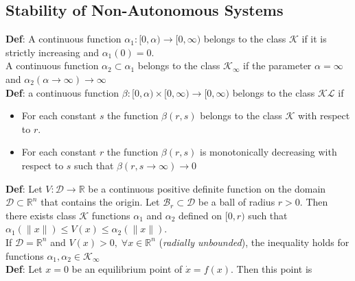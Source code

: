 \subsection{Stability of Non-Autonomous Systems}
\textbf{Def}: A continuous function $\alpha_1: [0,\alpha) \to [0,\infty)$ belongs to the class $\mathcal{K}$ if it is strictly increasing and $\alpha_1(0) = 0$. \\ %
A continuous function $\alpha_2 \subset \alpha_1$ belongs to the class $\mathcal{K}_{\infty}$ if the parameter $\alpha = \infty$ and $\alpha_2(\alpha \to \infty) \to \infty$\\
\textbf{Def}: a continuous function $\beta: [0,\alpha) \times [0,\infty) \to [0,\infty)$ belongs to the class $\mathcal{KL}$ if %
\begin{itemize}
    \item For each constant $s$ the function $\beta(r,s)$ belongs to the class $\mathcal{K}$ with respect to $r$.
    \item For each constant $r$ the function $\beta(r,s)$ is monotonically decreasing with respect to $s$ such that $\beta(r,s\to \infty) \to 0$
\end{itemize}
\textbf{Def}: Let $V : \mathcal{D} \to \mathbb{R}$ be a continuous positive definite function on the domain $\mathcal{D} \subset \mathbb{R}^n$ that contains the origin. Let $\mathcal{B}_r \subset \mathcal{D}$ be a ball of radius $r > 0$. Then there exists class $\mathcal{K}$ functions $\alpha_1$ and $\alpha_2$ defined on $[0,r)$ such that $\alpha_1(\lVert x \rVert) \le V(x) \le \alpha_2(\lVert x \rVert) $.\\ %
If $\mathcal{D} = \mathbb{R}^n$ and $V(x) > 0, \; \forall x\in \mathbb{R}^n$ (\textit{radially unbounded}), the inequality holds for functions $\alpha_1, \alpha_2 \in \mathcal{K}_\infty$  \\
\textbf{Def}: Let $x=0$ be an equilibrium point of $\Dot{x} = f(x)$. Then this point is
